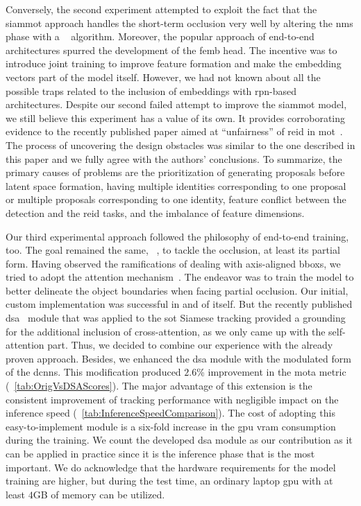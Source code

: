 Conversely, the second experiment attempted to exploit the fact that the \gls{siammot} approach handles the short-term occlusion very well by altering the \gls{nms} phase with a \featurenms{}~\cite{salscheider2020featurenms} algorithm. Moreover, the popular approach of end-to-end architectures spurred the development of the \gls{femb} head. The incentive was to introduce joint training to improve feature formation and make the embedding vectors part of the model itself. However, we had not known about all the possible traps related to the inclusion of embeddings with \gls{rpn}-based architectures. Despite our second failed attempt to improve the \gls{siammot} model, we still believe this experiment has a value of its own. It provides corroborating evidence to the recently published paper aimed at ``unfairness'' of \gls{reid} in \gls{mot}~\cite{zhang2021fairmot}. The process of uncovering the design obstacles was similar to the one described in this paper and we fully agree with the authors' conclusions. To summarize, the primary causes of problems are the prioritization of generating proposals before latent space formation, having multiple identities corresponding to one proposal or multiple proposals corresponding to one identity, feature conflict between the detection and the \gls{reid} tasks, and the imbalance of feature dimensions.

Our third experimental approach followed the philosophy of end-to-end training, too. The goal remained the same, \ietext{}~, to tackle the occlusion, at least its partial form. Having observed the ramifications of dealing with axis-aligned \glspl{bbox}, we tried to adopt the attention mechanism~\cite{vaswani2017attention}. The endeavor was to train the model to better delineate the object boundaries when facing partial occlusion. Our initial, custom implementation was successful in and of itself. But the recently published \gls{dsa}~\cite{yu2021dsa} module that was applied to the \gls{sot} Siamese tracking provided a grounding for the additional inclusion of cross-attention, as we only came up with the self-attention part. Thus, we decided to combine our experience with the already proven approach. Besides, we enhanced the \gls{dsa} module with the modulated form of the \glspl{dcnn}. This modification produced $2.6$\% improvement in the \gls{mota} metric (\tabletext{}~\ref{tab:OrigVsDSAScores}). The major advantage of this extension is the consistent improvement of tracking performance with negligible impact on the inference speed (\tabletext{}~\ref{tab:InferenceSpeedComparison}). The cost of adopting this easy-to-implement module is a six-fold increase in the \gls{gpu} \gls{vram} consumption during the training. We count the developed \gls{dsa} module as our contribution as it can be applied in practice since it is the inference phase that is the most important. We do acknowledge that the hardware requirements for the model training are higher, but during the test time, an ordinary laptop \gls{gpu} with at least $4$GB of memory can be utilized.

